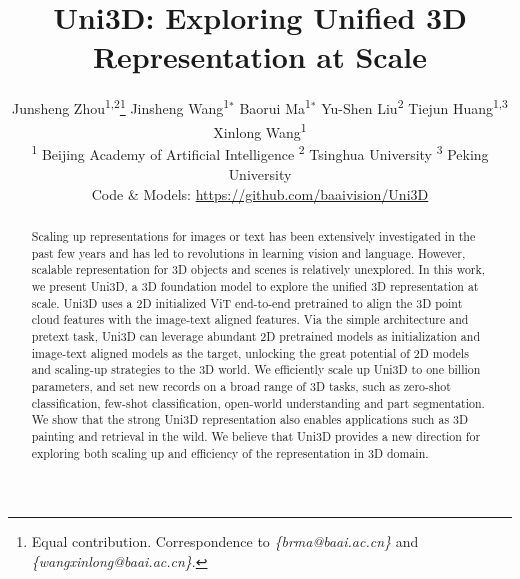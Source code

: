 \documentclass{article} \usepackage{iclr2024_conference,times}
\def\Ours{Uni3D\xspace}
\newcommand{\authorskip}{\hspace{12mm}}
\begin{document}
\title{\Ours: Exploring Unified 3D Representation at Scale}




\author{Junsheng Zhou\textsuperscript{1,2}\thanks{Equal contribution. Correspondence to \textit{\{brma@baai.ac.cn\}} and \textit{\{wangxinlong@baai.ac.cn\}}. 
} 
\authorskip Jinsheng Wang\textsuperscript{1}$^*$ \authorskip Baorui Ma\textsuperscript{1}$^*$ \authorskip Yu-Shen Liu\textsuperscript{2} \authorskip  
Tiejun Huang\textsuperscript{1,3} \authorskip Xinlong Wang\textsuperscript{1}  \\
{
\fontsize{10.4pt}{9.84pt}\selectfont
\textsuperscript{1} Beijing Academy of Artificial Intelligence \hspace{5mm} 
\textsuperscript{2} Tsinghua University \hspace{5mm} \textsuperscript{3} Peking University}\\

{
\fontsize{9.4pt}{9.84pt}\selectfont 
\vspace{0.2cm}
Code \& Models: {\url{https://github.com/baaivision/Uni3D}}
}
}



\newcommand{\fix}{\marginpar{FIX}}
\newcommand{\new}{\marginpar{NEW}}

\iclrfinalcopy 


\maketitle

\begin{abstract}





Scaling up representations for images or text has been extensively investigated in the past few years and has led to revolutions in learning vision and language.
However, scalable representation for 3D objects and scenes is relatively unexplored.
In this work, we present \Ours, a 3D foundation model to explore the unified 3D representation at scale.
\Ours uses a 2D initialized ViT end-to-end pretrained to align the 3D point cloud features with the image-text aligned features.
Via the simple architecture and pretext task, \Ours can leverage abundant 2D pretrained models as initialization and image-text aligned models as the target, unlocking the great potential of 2D models and scaling-up strategies to the 3D world.
We efficiently scale up \Ours to one billion parameters, and set new records on a broad range of 3D tasks, such as zero-shot classification, few-shot classification, open-world understanding and part segmentation. 
We show that the strong \Ours representation also enables applications such as 3D painting and retrieval in the wild.
We believe that \Ours provides a new direction for exploring both scaling up and efficiency of the representation in 3D domain.


\end{abstract}
\end{document}
